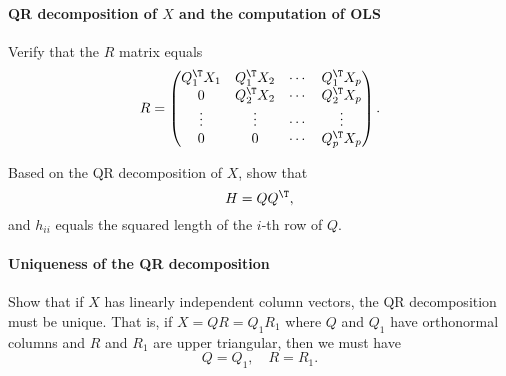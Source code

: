  \paragraph{QR decomposition of $X$ and the computation of OLS}\label{hw3::ols-qr-decomposition}
 
Verify that the $R$ matrix equals 
 $$
R = 
\begin{pmatrix}
Q_1^{\T} X_1 & Q_1^{\T} X_2 & \cdots &  Q_1^{\T} X_p  \\
0 & Q_2^{\T} X_2& \cdots &  Q_2^{\T} X_p  \\
\vdots & \vdots &  \cdots &  \vdots \\
0&0& \cdots & Q_p^{\T} X_p
\end{pmatrix}.
$$

Based on the QR decomposition of $X$, show that 
$$
H = QQ^{\T},
$$ 
and $h_{ii}$ equals the squared length of the $i$-th row of $Q$. 




 \paragraph{Uniqueness of the QR decomposition}\label{hw6::uniqueQR}
 
 Show that if $X$ has linearly independent column vectors, the QR decomposition must be unique. That is, if $X = QR = Q_1 R_1$ where $Q$ and $Q_1$ have orthonormal columns and $R$ and $R_1$ are upper triangular, then we must have
 $$
 Q = Q_1,\quad  R = R_1.
 $$
 

